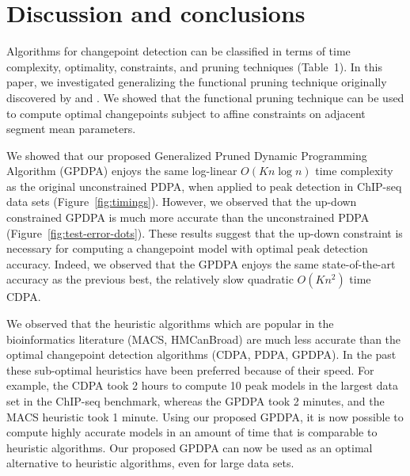 \documentclass{article}
\begin{document}
%   

\section{Discussion and conclusions}
\label{sec:discussion}

Algorithms for changepoint detection can be classified in terms of
time complexity, optimality, constraints, and pruning techniques
(Table~1). In this paper, we investigated generalizing the functional
pruning technique originally discovered by \citet{pruned-dp} and
\citet{johnson}. We showed that the functional pruning technique can
be used to compute optimal changepoints subject to affine constraints
on adjacent segment mean parameters.

We showed that our proposed Generalized Pruned Dynamic Programming
Algorithm (GPDPA) enjoys the same log-linear $O(Kn\log n)$ time
complexity as the original unconstrained PDPA, when applied to peak
detection in ChIP-seq data sets (Figure~\ref{fig:timings}). However,
we observed that the up-down constrained GPDPA is much more accurate
than the unconstrained PDPA (Figure~\ref{fig:test-error-dots}). These
results suggest that the up-down constraint is necessary for computing
a changepoint model with optimal peak detection accuracy. Indeed, we
observed that the GPDPA enjoys the same state-of-the-art accuracy as
the previous best, the relatively slow quadratic $O(Kn^2)$ time
CDPA.


We observed that the heuristic algorithms which are popular in the
bioinformatics literature (MACS, HMCanBroad) are much less accurate
than the optimal changepoint detection algorithms (CDPA, PDPA,
GPDPA). In the past these sub-optimal heuristics have been preferred
because of their speed. For example, the CDPA took 2 hours to compute
10 peak models in the largest data set in the ChIP-seq benchmark,
whereas the GPDPA took 2 minutes, and the MACS heuristic took 1
minute. Using our proposed GPDPA, it is now possible to compute highly
accurate models in an amount of time that is comparable to heuristic
algorithms. Our proposed GPDPA can now be used as an optimal
alternative to heuristic algorithms, even for large data sets.
\end{document}
